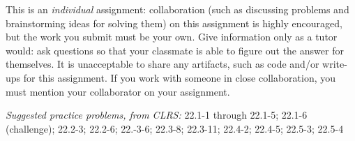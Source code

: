 \documentclass[letterpaper,11pt]{article}
\begin{document}






This is an \emph{individual} assignment: collaboration (such as discussing problems and brainstorming ideas for solving them) on this assignment is highly encouraged, but the work you submit must be your own. Give information only as a tutor would: ask questions so that your classmate is able to figure out the answer for themselves. It is unacceptable to share any artifacts, such as code and/or write-ups for this assignment. If you work with someone in close collaboration, you must mention your collaborator on your assignment.

\emph{Suggested practice problems, from CLRS:} 22.1-1 through 22.1-5; 22.1-6 (challenge); 22.2-3; 22.2-6; 22.-3-6; 22.3-8; 22.3-11; 22.4-2; 22.4-5; 22.5-3; 22.5-4
\end{document}
